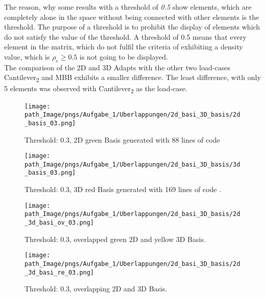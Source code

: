 The reason, why
  some results
  with a threshold of \emph{0.5} show elements, which 
  are completely alone in the space without being connected with
   other elements is the threshold. The purpose of a threshold is to prohibit the display
   of elements which do not satisfy the value of the threshold.
   A threshold of 0.5 means that every element in the matrix, which do not fulfil the
    criteria of exhibiting a density value, which is $\rho_e \geq 0.5$ is not going to
    be displayed. \\
       
     The comparison of the 2D and 3D Adapts with the other two load-cases Cantilever\textsubscript{2} and MBB exhibits a smaller difference. The least difference, with only 5 elements was observed with Cantilever\textsubscript{2} as the load-case.
   
\begin{figure}[!h]
\begin{minipage}{0.45\textwidth}
  \texttt{[image: path\_Image/pngs/Aufgabe\_1/Uberlappungen/2d\_basi\_3D\_basis/2d\_basis\_03.png]}
	\caption{Threshold: 0.3, 2D green Basis generated with 88 lines of code \protect\cite{Andreassen.2011}} 
	\label{fig_2dbasis_03}
\end{minipage}
\hfill
\begin{minipage}{0.45\textwidth}
  \texttt{[image: path\_Image/pngs/Aufgabe\_1/Uberlappungen/2d\_basi\_3D\_basis/3d\_basis\_03.png]}
	\caption{Threshold: 0.3, 3D red Basis generated with 169 lines of code \protect\cite{Liu.2014}.} 
	\label{fig_3dbasis_03}
\end{minipage}
\end{figure}
\begin{figure}[!h]
\begin{minipage}{0.45\textwidth}
  \texttt{[image: path\_Image/pngs/Aufgabe\_1/Uberlappungen/2d\_basi\_3D\_basis/2d\_3d\_basi\_ov\_03.png]}
    \vspace*{-10mm}
	\caption{Threshold: 0.3, overlapped green 2D and yellow 3D Basis.} 
	\label{fig_3dbasis_overl_03}
\end{minipage}
\hfill
\begin{minipage}{0.45\textwidth}
  \texttt{[image: path\_Image/pngs/Aufgabe\_1/Uberlappungen/2d\_basi\_3D\_basis/2d\_3d\_basi\_re\_03.png]}
    \vspace*{-10mm}
	\caption{Threshold: 0.3, overlapping 2D and 3D Basis.} 
	\label{fig_3dbasis_re_03}
	\end{minipage}
\end{figure}

